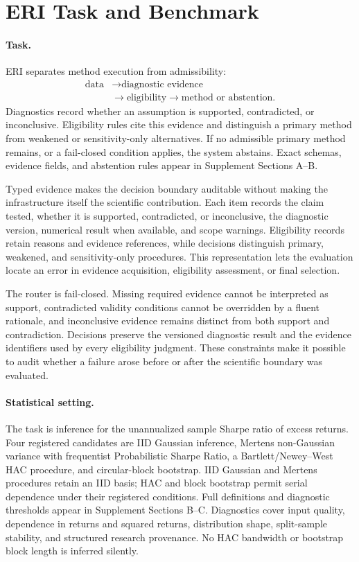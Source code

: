 \section{ERI Task and Benchmark}
\label{sec:task-benchmark}

\paragraph{Task.}
ERI separates method execution from admissibility:
\[
\begin{aligned}
\text{data} &\longrightarrow \text{diagnostic evidence}\\
&\longrightarrow \text{eligibility}
\longrightarrow \text{method or abstention}.
\end{aligned}
\]
Diagnostics record whether an assumption is supported, contradicted, or
inconclusive.  Eligibility rules cite this evidence and distinguish a primary
method from weakened or sensitivity-only alternatives.  If no admissible
primary method remains, or a fail-closed condition applies, the system
abstains.  Exact schemas, evidence fields, and abstention rules appear in
Supplement Sections A--B.

Typed evidence makes the decision boundary auditable without making the
infrastructure itself the scientific contribution.  Each item records the
claim tested, whether it is supported, contradicted, or inconclusive, the
diagnostic version, numerical result when available, and scope warnings.
Eligibility records
retain reasons and evidence references, while decisions distinguish primary,
weakened, and sensitivity-only procedures.  This representation lets the
evaluation locate an error in evidence acquisition, eligibility assessment,
or final selection.

The router is fail-closed.  Missing required evidence cannot be interpreted as
support, contradicted validity conditions cannot be overridden by a fluent
rationale, and inconclusive evidence remains distinct from both support and
contradiction.  Decisions preserve the versioned diagnostic result and the
evidence identifiers used by every eligibility judgment.  These constraints
make it possible to audit whether a failure arose before or after the
scientific boundary was evaluated.

\paragraph{Statistical setting.}
The task is inference for the unannualized sample Sharpe ratio of excess
returns.  Four registered candidates are IID Gaussian inference, Mertens
non-Gaussian variance with frequentist Probabilistic Sharpe Ratio, a
Bartlett/Newey--West HAC procedure, and circular-block bootstrap.  IID
Gaussian and Mertens procedures retain an IID basis; HAC and block bootstrap
permit serial dependence under their registered conditions.  Full definitions
and diagnostic thresholds appear in Supplement Sections B--C.  Diagnostics
cover input quality, dependence in returns and squared returns, distribution
shape, split-sample stability, and structured research provenance.  No HAC
bandwidth or bootstrap block length is inferred silently.

